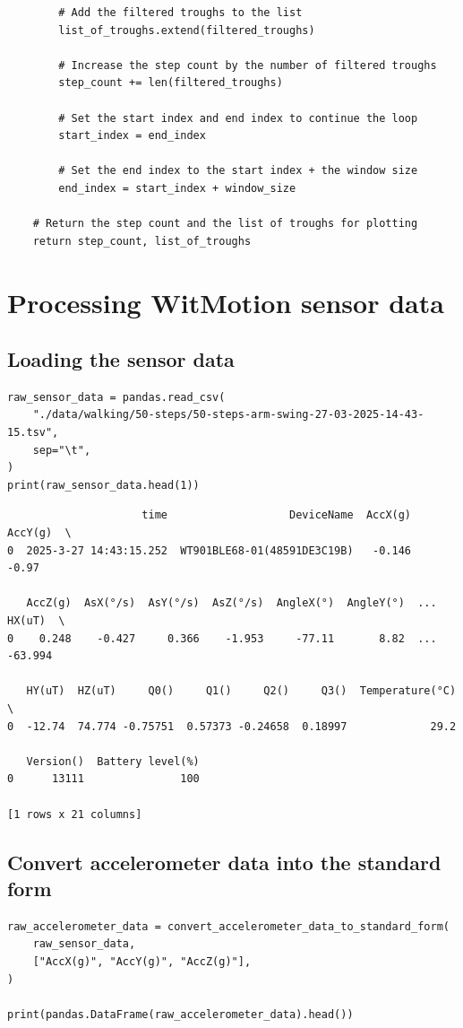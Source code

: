 \documentclass[12pt]{report}
\begin{document}
\begin{verbatim}
        # Add the filtered troughs to the list
        list_of_troughs.extend(filtered_troughs)

        # Increase the step count by the number of filtered troughs
        step_count += len(filtered_troughs)

        # Set the start index and end index to continue the loop
        start_index = end_index

        # Set the end index to the start index + the window size
        end_index = start_index + window_size

    # Return the step count and the list of troughs for plotting
    return step_count, list_of_troughs
\end{verbatim}
\section{Processing WitMotion sensor data}
\label{sec:org2d850da}

\subsection{Loading the sensor data}
\label{sec:org4024031}
\begin{verbatim}
raw_sensor_data = pandas.read_csv(
    "./data/walking/50-steps/50-steps-arm-swing-27-03-2025-14-43-15.tsv",
    sep="\t",
)
print(raw_sensor_data.head(1))
\end{verbatim}

\label{org3b4a67a}
\begin{verbatim}
                     time                   DeviceName  AccX(g)  AccY(g)  \
0  2025-3-27 14:43:15.252  WT901BLE68-01(48591DE3C19B)   -0.146    -0.97   

   AccZ(g)  AsX(°/s)  AsY(°/s)  AsZ(°/s)  AngleX(°)  AngleY(°)  ...  HX(uT)  \
0    0.248    -0.427     0.366    -1.953     -77.11       8.82  ... -63.994   

   HY(uT)  HZ(uT)     Q0()     Q1()     Q2()     Q3()  Temperature(°C)  \
0  -12.74  74.774 -0.75751  0.57373 -0.24658  0.18997             29.2   

   Version()  Battery level(%)  
0      13111               100  

[1 rows x 21 columns]
\end{verbatim}
\subsection{Convert accelerometer data into the standard form}
\label{sec:org876067e}
\begin{verbatim}
raw_accelerometer_data = convert_accelerometer_data_to_standard_form(
    raw_sensor_data,
    ["AccX(g)", "AccY(g)", "AccZ(g)"],
)

print(pandas.DataFrame(raw_accelerometer_data).head())
\end{verbatim}
\end{document}
